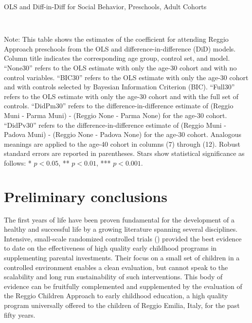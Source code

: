 \documentclass[12pt]{article}
\begin{document}
\begin{landscape}
\begin{table}[H] \caption{OLS and Diff-in-Diff for Social Behavior, Preschools, Adult Cohorts} \label{ols-S-reg}
\scalebox{0.80}{
}
\vspace{1ex} \\
\footnotesize\raggedright{Note: This table shows the estimates of the coefficient for attending Reggio Approach preschools from the OLS and difference-in-difference (DiD) models. Column title indicates the corresponding age group, control set, and model. ``None30'' refers to the OLS estimate with only the age-30 cohort and with no control variables. ``BIC30'' refers to the OLS estimate with only the age-30 cohort and with controls selected by Bayesian Information Criterion (BIC). ``Full30'' refers to the OLS estimate with only the age-30 cohort and with the full set of controls. ``DidPm30'' refers to the difference-in-difference estimate of (Reggio Muni - Parma Muni) - (Reggio None - Parma None) for the age-30 cohort. ``DidPv30'' refers to the difference-in-difference estimate of (Reggio Muni - Padova Muni) - (Reggio None - Padova None) for the age-30 cohort.  Analogous meanings are applied to the age-40 cohort in columns (7) through (12). Robust standard errors are reported in parentheses. Stars show statistical significance as follows: * $p < 0.05$, ** $p < 0.01$, *** $p < 0.001$.}
\end{table}
\end{landscape}

\section{Preliminary conclusions} \label{sec:conclusion}

The first years of life have been proven fundamental for the development of a healthy and successful life by a growing literature spanning several disciplines. Intensive, small-scale randomized controlled trials (\cite{Heckman2013a,Campbell2014,Gertler2014}) provided the best evidence to date on the effectiveness of high quality early childhood programs in supplementing parental investments. Their focus on a small set of children in a controlled environment enables a clean evaluation, but cannot speak to the scalability and long run sustainability of such interventions. This body of evidence can be fruitfully complemented and supplemented by the evaluation of the Reggio Children Approach to early childhood education, a high quality program universally offered to the children of Reggio Emilia, Italy, for the past fifty years.
\end{document}

